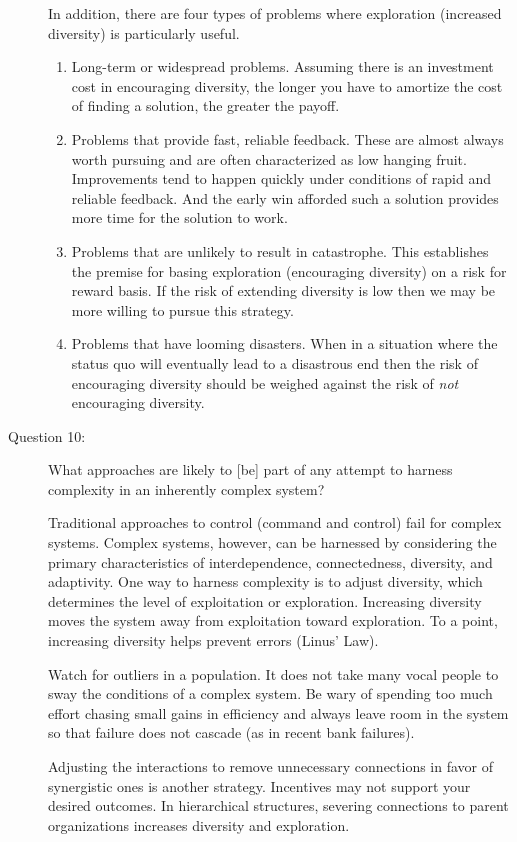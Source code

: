 \documentclass[letterpaper,10pt]{article}
\begin{document}
\begin{description}
In addition, there are four types of problems where exploration (increased diversity) is particularly useful.
\begin{enumerate}
  \item Long-term or widespread problems.  Assuming there is an investment cost in encouraging diversity, the longer you have to amortize the cost of finding a solution, the greater the payoff.
  \item Problems that provide fast, reliable feedback.  These are almost always worth pursuing and are often characterized as low hanging fruit.  Improvements tend to happen quickly under conditions of rapid and reliable feedback.  And the early win afforded such a solution provides more time for the solution to work.
  \item Problems that are unlikely to result in catastrophe.  This establishes the premise for basing exploration (encouraging diversity) on a risk for reward basis.  If the risk of extending diversity is low then we may be more willing to pursue this strategy.
  \item Problems that have looming disasters. When in a situation where the status quo will eventually lead to a disastrous end then the risk of encouraging diversity should be weighed against the risk of \emph{not} encouraging diversity.
\end{enumerate}

\item[Question 10:]
What approaches are likely to [be] part of any attempt to harness complexity in an inherently complex system?

Traditional approaches to control (command and control) fail for complex systems.  Complex systems, however, can be harnessed by considering the primary characteristics of interdependence, connectedness, diversity, and adaptivity.  One way to harness complexity is to adjust diversity, which determines the level of exploitation or exploration.  Increasing diversity moves the system away from exploitation toward exploration.  To a point, increasing diversity helps prevent errors
(Linus' Law).

Watch for outliers in a population.  It does not take many vocal people to sway the conditions of a complex system.  Be wary of spending too much effort chasing small gains in efficiency and always leave room in the system so that failure does not cascade (as in recent bank failures).

Adjusting the interactions to remove unnecessary connections in favor of synergistic ones is another strategy.  Incentives may not support your desired outcomes.  In hierarchical structures, severing connections to parent organizations increases diversity and exploration.


\end{description}
\end{document}
